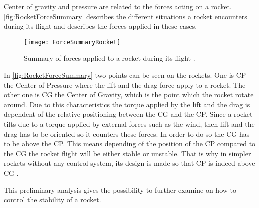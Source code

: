 Center of gravity and pressure are related to the forces acting on a rocket. \autoref{fig:RocketForceSummary} describes the different situations a rocket encounters during its flight and describes the forces applied in these cases.
\begin{figure}[htbp]
	\centering
	\texttt{[image: ForceSummaryRocket]}
	\caption{Summary of forces applied to a rocket during its flight \cite{web:rocketnasa}.}
	\label{fig:RocketForceSummary}
\end{figure}


\bigbreak
In \autoref{fig:RocketForceSummary} two points can be seen on the rockets. One is CP the Center of Pressure where the lift and the drag force apply to a rocket. The other one is CG the Center of Gravity, which is the point which the rocket rotate around. Due to this characteristics the torque applied by the lift and the drag is dependent of the relative positioning between the CG and the CP. Since a rocket tilts due to a torque applied by external forces such as the wind, then lift and the drag has to be oriented so it counters these forces. In order to do so the CG has to be above the CP.
This means depending of the position of the CP compared to the CG the rocket flight will be either stable or unstable. That is why in simpler rockets without any control system, its design is made so that CP is indeed above CG \cite{web:rocketnasa}.

This preliminary analysis gives the possibility to further examine on how to control the stability of a rocket.


%